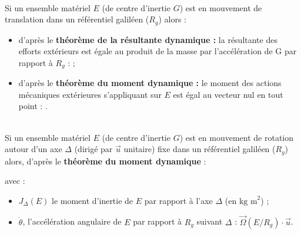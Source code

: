 \documentclass[10pt,fleqn]{article} %
\begin{document}
\begin{definition} ~\\
Si un ensemble matériel $E$ (de centre d'inertie $G$) est en mouvement de translation dans un référentiel galiléen ($R_g$) alors : 

\begin{itemize}
\item d'après le \textbf{théorème de la résultante dynamique : } la résultante des efforts extérieurs est égale au produit de la masse par l'accélération de G par rapport à $R_g$ :
;%
\item d'après le \textbf{théorème du moment dynamique : } le moment des actions mécaniques extérieures s'appliquant sur $E$ est égal au vecteur nul en tout point :
.
\end{itemize}

\end{definition}
 



\begin{definition} ~\\
Si un ensemble matériel $E$ (de centre d'inertie $G$) est en mouvement de rotation autour d'un axe $\Delta$ (dirigé par $\overrightarrow{u}$ unitaire) fixe dans un référentiel galiléen ($R_g$) alors, d'après le \textbf{théorème du moment dynamique} :

 avec :
\begin{itemize}
\item  $J_{\Delta}(E)$ le moment d'inertie de $E$ par rapport à l'axe $\Delta$ (en $\text{kg  m}^2$) ;
\item $\ddot{\theta}$, l'accélération angulaire de $E$ par rapport à $R_g$ suivant $\Delta$ : $\overrightarrow{\Omega}(E/R_g)\cdot \overrightarrow{u}$.
\end{itemize}
\end{definition}
\end{document}
